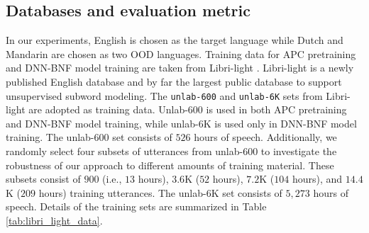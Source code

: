 \documentclass[a4paper]{article}
\begin{document}
\subsection{Databases and evaluation metric}
In our experiments, English is chosen as the target language while Dutch and Mandarin are chosen as two OOD languages. %
Training data for APC pretraining and DNN-BNF model training are taken from  Libri-light \cite{kahn2019librilight}. 
Libri-light is a newly published English database and  by far the largest public database to support unsupervised subword modeling. 
The \texttt{unlab-600} and  \texttt{unlab-6K} sets from Libri-light are adopted as training data. Unlab-600 is used in both APC pretraining and DNN-BNF model training, while unlab-6K is used only in DNN-BNF model training.
The  unlab-600 set consists of 
$526$ hours of speech. Additionally, we randomly select four subsets of utterances from unlab-600 to investigate the robustness of our approach to different amounts of training material. These subsets consist of $900$ (i.e., $13$ hours), $3.6$K ($52$ hours), $7.2$K ($104$ hours), and $14.4$K ($209$ hours) training utterances. 
The  unlab-6K  set consists of $5,273$ hours of speech.  Details of the training sets are summarized in Table \ref{tab:libri_light_data}.
\end{document}
